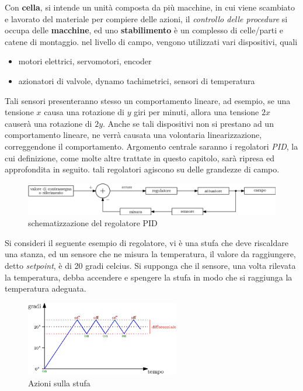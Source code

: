 \documentclass[10pt, letterpaper]{report}
\begin{document}
Con \textbf{cella}, si intende un unità composta da più macchine, in 
cui viene scambiato e lavorato del materiale per compiere delle azioni,
il \textit{controllo delle procedure} si occupa delle \textbf{macchine}, ed uno 
\textbf{stabilimento} è un complesso di celle/parti e catene 
di montaggio. nel livello di campo, vengono utilizzati vari dispositivi, 
quali\begin{itemize}
    \item motori elettrici, servomotori, encoder 
    \item azionatori di valvole, dynamo tachimetrici, sensori di temperatura
\end{itemize}
Tali sensori presenteranno stesso un comportamento lineare, ad esempio, 
se una tensione $x$ causa una rotazione di $y$ giri per minuti, allora 
una tensione $2x$ causerà una  rotazione di $2y$. Anche se tali dispositivi 
non si prestano ad un comportamento lineare, ne verrà causata una volontaria 
linearizzazione, correggendone il comportamento.\acc 
Argomento centrale saranno i regolatori \textit{PID}, la cui definizione, 
come molte altre trattate in questo capitolo, sarà ripresa ed 
approfondita in seguito. tali regolatori agiscono su delle grandezze 
di campo.\begin{center}
    \begin{figure}[h!]
        \centering
        \includegraphics[width=1\textwidth ]{images/schemaPID.eps}
        \caption{schematizzazione del regolatore PID}
        \label{fig:schemaPID}
   \end{figure}
\end{center}
Si consideri il seguente esempio di regolatore, vi è una stufa che deve 
riscaldare una stanza, ed un sensore che ne misura la temperatura, il valore 
da raggiungere, detto \textit{setpoint}, è di 20 gradi celcius. Si supponga che il 
sensore, una volta rilevata la temperatura, debba accendere e spengere la stufa 
in modo che si raggiunga la temperatura adeguata.
\begin{center}
    \begin{figure}[h!]
        \centering
        \includegraphics[width=0.6\textwidth ]{images/stufaEsempio.eps}
        \caption{Azioni sulla stufa}
        \label{fig:stufa}
   \end{figure} 
\end{center}
\end{document}
